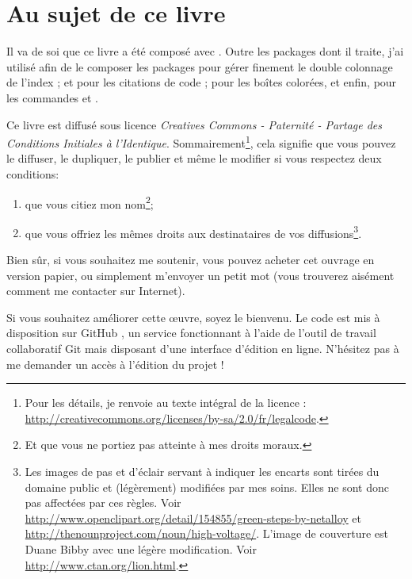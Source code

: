 \section*{Au sujet de ce livre}

Il va de soi que ce livre a été composé avec \XeLaTeX. Outre les packages dont il traite, j'ai utilisé afin de le composer les packages  pour gérer finement le double colonnage de l'index ;  et  pour les citations de code ;  pour les boîtes colorées, et enfin,  pour les commandes \XeLaTeX et \XeTeX.



Ce livre est diffusé sous licence \emph{Creatives Commons - Paternité - Partage des Conditions Initiales à l'Identique}. Sommairement\footnote{Pour les détails, je renvoie au texte intégral de la licence : \url{http://creativecommons.org/licenses/by-sa/2.0/fr/legalcode}.}, cela signifie que vous pouvez le diffuser, le dupliquer, le publier et même le modifier si vous respectez deux conditions:
\begin{enumerate}
\item que vous citiez mon nom\footnote{Et que vous ne portiez  pas atteinte à mes droits moraux.};
\item que vous offriez les mêmes droits aux destinataires de vos diffusions\footnote{Les images de pas et d'éclair servant à indiquer les encarts sont tirées du domaine public et (légèrement) modifiées par mes soins. Elles ne sont donc pas affectées par ces règles. Voir \url{http://www.openclipart.org/detail/154855/green-steps-by-netalloy} et \url{http://thenounproject.com/noun/high-voltage/}. L'image de couverture est Duane  Bibby avec une légère modification. Voir \url{http://www.ctan.org/lion.html}.}.
\end{enumerate}

Bien sûr, si vous souhaitez me soutenir, vous pouvez acheter cet ouvrage en version papier, ou simplement m'envoyer un petit mot (vous trouverez aisément comment me contacter sur Internet).

Si vous souhaitez améliorer cette œuvre, soyez le bienvenu. Le code est mis à disposition sur GitHub \url{}, un service fonctionnant à l'aide de l'outil de travail collaboratif Git mais disposant d'une interface d'édition en ligne. N'hésitez pas à me demander un accès à l'édition du projet ! 

